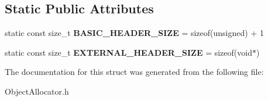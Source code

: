 \subsection*{Static Public Attributes}
\begin{DoxyCompactItemize}
\item 
\hypertarget{structOAConfig_a4474c8412a0fc66a4d990dcb6b544299}{static const size\-\_\-t {\bfseries B\-A\-S\-I\-C\-\_\-\-H\-E\-A\-D\-E\-R\-\_\-\-S\-I\-Z\-E} = sizeof(unsigned) + 1}\label{structOAConfig_a4474c8412a0fc66a4d990dcb6b544299}

\item 
\hypertarget{structOAConfig_a6da9f1d439103801855d9053107a6410}{static const size\-\_\-t {\bfseries E\-X\-T\-E\-R\-N\-A\-L\-\_\-\-H\-E\-A\-D\-E\-R\-\_\-\-S\-I\-Z\-E} = sizeof(void$\ast$)}\label{structOAConfig_a6da9f1d439103801855d9053107a6410}

\end{DoxyCompactItemize}


The documentation for this struct was generated from the following file\-:\begin{DoxyCompactItemize}
\item 
Object\-Allocator.\-h\end{DoxyCompactItemize}
